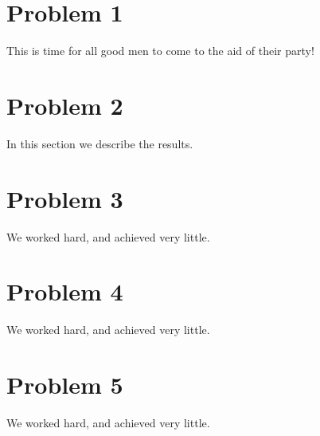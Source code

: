 \documentclass[12pt]{article}
\begin{document}
\maketitle

\section{Problem 1}\label{Problem 1}
This is time for all good men to come to the aid of their party!

\section{Problem 2}\label{Problem 2}
In this section we describe the results.

\section{Problem 3}\label{Problem 3}
We worked hard, and achieved very little.

\section{Problem 4}\label{Problem 4}
We worked hard, and achieved very little.

\section{Problem 5}\label{Problem 5}
We worked hard, and achieved very little.
\end{document}

